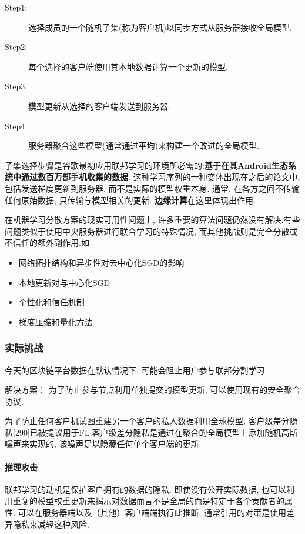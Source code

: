     \begin{description}
        \item[Step1:] 选择成员的一个随机子集(称为客户机)以同步方式从服务器接收全局模型. 
        \item[Step2:] 每个选择的客户端使用其本地数据计算一个更新的模型. 
        \item[Step3:] 模型更新从选择的客户端发送到服务器.  
        \item[Step4:] 服务器聚合这些模型(通常通过平均)来构建一个改进的全局模型.  
    \end{description}

子集选择步骤是谷歌最初应用联邦学习的环境所必需的:\textbf{基于在其Android生态系统中通过数百万部手机收集的数据}. 这种学习序列的一种变体出现在之后的论文中, 包括发送梯度更新到服务器, 而不是实际的模型权重本身. 通常, 在各方之间不传输任何原始数据, 只传输与模型相关的更新. \textbf{边缘计算}在这里体现出作用. 
 
在机器学习分散方案的现实可用性问题上, 许多重要的算法问题仍然没有解决.有些问题类似于使用中央服务器进行联合学习的特殊情况, 而其他挑战则是完全分散或不信任的额外副作用.如
\begin{itemize}
    
\item 网络拓扑结构和异步性对去中心化SGD的影响
\item 本地更新对与中心化SGD
\item 个性化和信任机制
\item 梯度压缩和量化方法
\end{itemize}

\paragraph{}
 
    \subsubsection{实际挑战}

今天的区块链平台数据在默认情况下, 可能会阻止用户参与联邦分割学习.

解决方案：
为了防止参与节点利用单独提交的模型更新, 可以使用现有的安全聚合协议.

为了防止任何客户机试图重建另一个客户的私人数据利用全球模型, 客户级差分隐私[290]已被提议用于FL.客户级差分隐私是通过在聚合的全局模型上添加随机高斯噪声来实现的, 该噪声足以隐藏任何单个客户端的更新.

\paragraph{推理攻击} 联邦学习的动机是保护客户拥有的数据的隐私. 即使没有公开实际数据, 也可以利用重复的模型权重更新来揭示对数据而言不是全局的而是特定于各个贡献者的属性. 可以在服务器端以及（其他）客户端端执行此推断. 通常引用的对策是使用差异隐私来减轻这种风险. 

